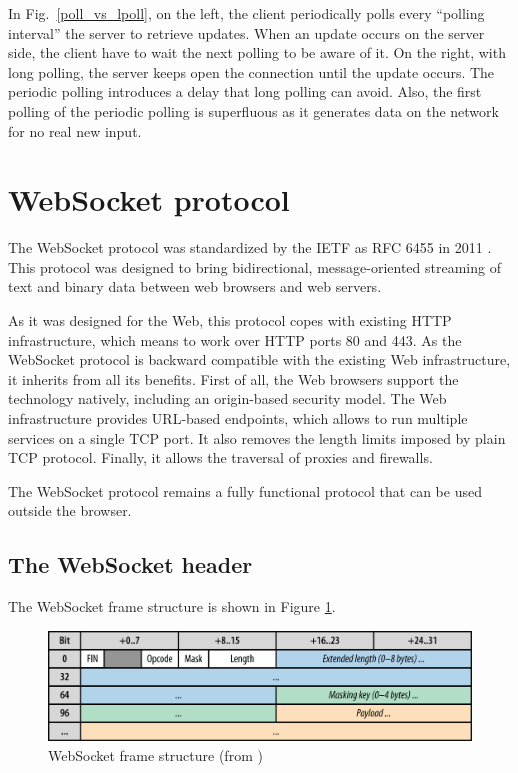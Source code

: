 \documentclass[10pt,journal,compsoc]{IEEEtran}
\newcommand{\ws}{WebSocket}
\begin{document}
In Fig.~\ref{poll_vs_lpoll}, on the left, the client periodically polls every ``polling interval'' the server to retrieve updates. When an update occurs on the server side, the client have to wait the next polling to be aware of it. On the right, with long polling, the server keeps open the connection until the update occurs. The periodic polling introduces a delay that long polling can avoid. Also, the first polling of the periodic polling is superfluous as it generates data on the network for no real new input.

\section{\ws{} protocol}
The \ws{} protocol was standardized by the IETF as RFC 6455 in 2011 \cite{rfc6455}.
This protocol was designed to bring bidirectional, message-oriented streaming of text and binary data between web browsers and web servers.

As it was designed for the Web, this protocol copes with existing HTTP infrastructure, which means to work over HTTP ports 80 and 443.
As the \ws{} protocol is backward compatible with the existing Web infrastructure, it inherits from all its benefits.
First of all, the Web browsers support the technology natively, including an origin-based security model.
The Web infrastructure provides URL-based endpoints, which allows to run multiple services on a single TCP port.
It also removes the length limits imposed by plain TCP protocol.
Finally, it allows the traversal of proxies and firewalls.

The \ws{} protocol remains a fully functional protocol that can be used outside the browser.


\subsection{The \ws{} header}

The \ws{} frame structure is shown in Figure \ref{fig:websocket_frame}.

\begin{figure}
    \centering
    \includegraphics[width=\linewidth]{websocket_frame.png}
    \caption{\ws{} frame structure (from \cite{HighPerfBrowserNetworking:websocket})}
    \label{fig:websocket_frame}
\end{figure}
\end{document}
